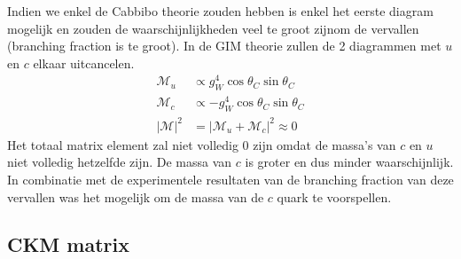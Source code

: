 \documentclass[../main.tex]{subfiles}
\begin{document}
Indien we enkel de Cabbibo theorie zouden hebben is enkel het eerste diagram mogelijk en zouden de waarschijnlijkheden veel te groot zijnom de vervallen (branching fraction is te groot). In de GIM theorie zullen de 2 diagrammen met $u$ en $c$ elkaar uitcancelen.
\begin{equation}
    \begin{aligned}
        \label{eq:fcnc_mat_el}
        \mathcal{M}_{u} &\propto g_{W}^{4} \cos \theta_{C} \sin \theta_{C}\\
        \mathcal{M}_{c} &\propto-g_{W}^{4} \cos \theta_{C} \sin \theta_{C}\\
        |\mathcal{M}|^{2}&=\left|\mathcal{M}_{u}+\mathcal{M}_{c}\right|^{2} \approx 0
    \end{aligned}
\end{equation}
Het totaal matrix element zal niet volledig 0 zijn omdat de massa's van $c$ en $u$ niet volledig hetzelfde zijn. De massa van $c$ is groter en dus minder waarschijnlijk. In combinatie met de experimentele resultaten van de branching fraction van deze vervallen was het mogelijk om de massa van de $c$ quark te voorspellen.

\subsection{CKM matrix}%
\label{sub:ckm_matrix}
\end{document}
